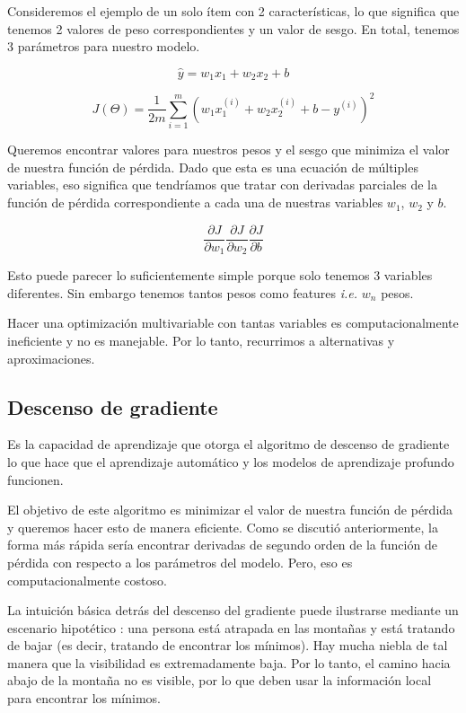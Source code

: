 \documentclass[a4paper,12pt]{article}
\begin{document}
Consideremos el ejemplo de un solo ítem con 2 características, lo que significa que tenemos 2 valores de peso correspondientes y un valor de sesgo. En total, tenemos 3 parámetros para nuestro modelo.

\begin{equation}
\hat{y} = w_1x_1 + w_2x_2 + b
\end{equation}

\begin{equation}
J(\Theta)=\frac{1}{2m} \sum_{i=1}^{m} (w_1x_1^{(i)}+w_2x_2^{(i)}+b-y^{(i)})^2
\end{equation}

Queremos encontrar valores para nuestros pesos y el sesgo que minimiza el valor de nuestra función de pérdida. Dado que esta es una ecuación de múltiples variables, eso significa que tendríamos que tratar con derivadas parciales de la función de pérdida correspondiente a cada una de nuestras variables $w_1$, $w_2$ y $b$.

\begin{equation}
\frac{\partial J}{\partial w_1} \frac{\partial J}{\partial w_2}
\frac{\partial J}{\partial b}
\end{equation}

Esto puede parecer lo suficientemente simple porque solo tenemos 3 variables diferentes.
Sin embargo tenemos tantos pesos como features \textit{i.e.} $w_n$ pesos.

Hacer una optimización multivariable con tantas variables es computacionalmente ineficiente y no es manejable. Por lo tanto, recurrimos a alternativas y aproximaciones.

\subsection{Descenso de gradiente}

Es la capacidad de aprendizaje que otorga el algoritmo de descenso de gradiente lo que hace que el aprendizaje automático y los modelos de aprendizaje profundo funcionen.

El objetivo de este algoritmo es minimizar el valor de nuestra función de pérdida y queremos hacer esto de manera eficiente.
Como se discutió anteriormente, la forma más rápida sería encontrar derivadas de segundo orden de la función de pérdida con respecto a los parámetros del modelo. Pero, eso es computacionalmente costoso.

La intuición básica detrás del descenso del gradiente puede ilustrarse mediante un escenario hipotético \citep{gdanalogy}: una persona está atrapada en las montañas y está tratando de bajar (es decir, tratando de encontrar los mínimos). Hay mucha niebla de tal manera que la visibilidad es extremadamente baja. Por lo tanto, el camino hacia abajo de la montaña no es visible, por lo que deben usar la información local para encontrar los mínimos.
\end{document}
